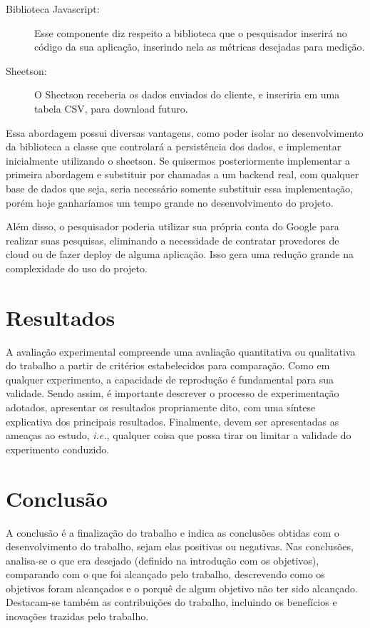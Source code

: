 \documentclass[12pt]{tcc}
\begin{document}
\begin{description}
	\item[Biblioteca Javascript:] Esse componente diz respeito a biblioteca que o pesquisador inserirá no código da sua aplicação, inserindo nela as métricas desejadas para medição.
	
	\item[Sheetson:] O Sheetson receberia os dados enviados do cliente, e inseriria em uma tabela CSV, para download futuro.

\end{description}

Essa abordagem possui diversas vantagens, como poder isolar no desenvolvimento da biblioteca a classe que controlará a persistência dos dados, e implementar inicialmente utilizando o sheetson. Se quisermos posteriormente implementar a primeira abordagem e substituir por chamadas a um backend real, com qualquer base de dados que seja, seria necessário somente substituir essa implementação, porém hoje ganharíamos um tempo grande no desenvolvimento do projeto.

Além disso, o pesquisador poderia utilizar sua própria conta do Google para realizar suas pesquisas, eliminando a necessidade de contratar provedores de cloud ou de fazer deploy de alguma aplicação. Isso gera uma redução grande na complexidade do uso do projeto.


\chapter{Resultados}
\label{sec:aval_exp}

A avaliação experimental compreende uma avaliação quantitativa ou qualitativa do trabalho a partir de critérios estabelecidos para comparação. Como em qualquer experimento, a capacidade de reprodução é fundamental para sua validade. Sendo assim, é importante descrever o processo de experimentação adotados, apresentar os resultados propriamente dito, com uma síntese explicativa dos principais resultados. Finalmente, devem ser apresentadas as ameaças ao estudo, \emph{i.e.}, qualquer coisa que possa tirar ou limitar a validade do experimento conduzido. 

\chapter{Conclusão}
	\label{sec:conclusao}

	A conclusão é a finalização do trabalho e indica as conclusões obtidas com o desenvolvimento do trabalho, sejam elas positivas ou negativas. Nas conclusões, analisa-se o que era desejado (definido na introdução com os objetivos), comparando com o que foi alcançado pelo trabalho, descrevendo como os objetivos foram alcançados e o porquê de algum objetivo não ter sido alcançado. Destacam-se também as contribuições do trabalho, incluindo os benefícios e inovações trazidas pelo trabalho.
\end{document}
